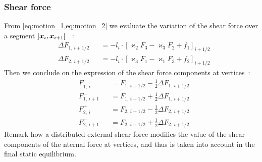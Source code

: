 \subsubsection{Shear force}
From \cref{eq:motion_1,eq:motion_2} we evaluate the variation of the shear force over a segment $]\boldsymbol{x}_{i},  \boldsymbol{x}_{i+1}[$ ~: 
\begin{subequations}
	\begin{alignat}{2}
		&\Delta F_{1,\,i+1/2}^{} &&= - l_i  \cdot {[\varkappa_2 F_3 - \varkappa_3 F_2 + f_1]}_{i+1/2}
		\\
		&\Delta F_{2,\,i+1/2}^{} &&= - l_i  \cdot {[\varkappa_3 F_1 - \varkappa_1 F_3 + f_2]}_{i+1/2}
	\end{alignat}
	\label{eq:DeltaF}
\end{subequations}
Then we conclude on the expression of the shear force components at vertices~:
\begin{subequations}
	\begin{alignat}{2}
		&F_{1,\,i}^{+} &&= F_{1,\,i+1/2} - \frac{1}{2} \Delta F_{1,\,i+1/2}  \\[0.5em]
		&F_{1,\,i+1}^{-} &&= F_{1,\,i+1/2} + \frac{1}{2} \Delta F_{1,\,i+1/2} \\[0.5em]
		&F_{2,\,i}^{+} &&= F_{2,\,i+1/2} - \frac{1}{2} \Delta F_{2,\,i+1/2}  \\[0.5em]
		&F_{2,\,i+1}^{-} &&= F_{2,\,i+1/2} + \frac{1}{2} \Delta F_{2,\,i+1/2}
	\end{alignat}
	\label{eq:dFi}
\end{subequations}
Remark how a distributed external shear force modifies the value of the shear components of the nternal force at vertices, and thus is taken into account in the final static equilibrium.

